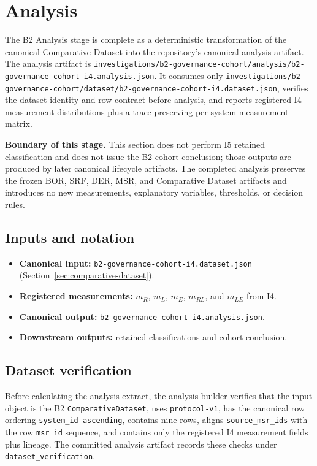 \section{Analysis}
\label{sec:analysis}
The B2 Analysis stage is complete as a deterministic transformation of the canonical Comparative Dataset into the repository's canonical analysis artifact. The analysis artifact is \texttt{investigations/b2-governance-cohort/analysis/b2-governance-cohort-i4.analysis.json}. It consumes only \texttt{investigations/b2-governance-cohort/dataset/b2-governance-cohort-i4.dataset.json}, verifies the dataset identity and row contract before analysis, and reports registered I4 measurement distributions plus a trace-preserving per-system measurement matrix.

\textbf{Boundary of this stage.} This section does not perform I5 retained classification and does not issue the B2 cohort conclusion; those outputs are produced by later canonical lifecycle artifacts. The completed analysis preserves the frozen BOR, SRF, DER, MSR, and Comparative Dataset artifacts and introduces no new measurements, explanatory variables, thresholds, or decision rules.

\subsection{Inputs and notation}
\begin{itemize}
  \item \textbf{Canonical input:} \texttt{b2-governance-cohort-i4.dataset.json} (Section~\ref{sec:comparative-dataset}).
  \item \textbf{Registered measurements:} $m_R$, $m_L$, $m_E$, $m_{RL}$, and $m_{LE}$ from I4.
  \item \textbf{Canonical output:} \texttt{b2-governance-cohort-i4.analysis.json}.
  \item \textbf{Downstream outputs:} retained classifications and cohort conclusion.
\end{itemize}

\subsection{Dataset verification}
Before calculating the analysis extract, the analysis builder verifies that the input object is the B2 \texttt{ComparativeDataset}, uses \texttt{protocol-v1}, has the canonical row ordering \texttt{system\_id ascending}, contains nine rows, aligns \texttt{source\_msr\_ids} with the row \texttt{msr\_id} sequence, and contains only the registered I4 measurement fields plus lineage. The committed analysis artifact records these checks under \texttt{dataset\_verification}.

